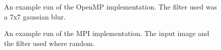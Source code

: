 \documentclass{article}
\begin{document}
\begin{figure}
  \centering
  \caption{An example run of the OpenMP implementation. The filter used was a 7x7
    gaussian blur.}
  \label{fig:blur}
\end{figure}

\begin{figure}
  \centering
  \caption{An example run of the MPI implementation. The input image and the
    filter used where random.}
  \label{fig:random}
\end{figure}
\end{document}
